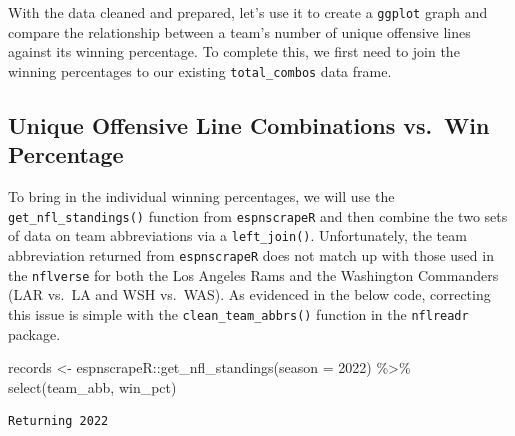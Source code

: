 \documentclass[
  letterpaper,
]{krantz}
\newenvironment{Shaded}{\begin{snugshade}}{\end{snugshade}}
\newcommand{\AttributeTok}[1]{\textcolor[rgb]{0.40,0.45,0.13}{#1}}
\newcommand{\DecValTok}[1]{\textcolor[rgb]{0.68,0.00,0.00}{#1}}
\newcommand{\FunctionTok}[1]{\textcolor[rgb]{0.28,0.35,0.67}{#1}}
\newcommand{\NormalTok}[1]{\textcolor[rgb]{0.00,0.23,0.31}{#1}}
\newcommand{\OtherTok}[1]{\textcolor[rgb]{0.00,0.23,0.31}{#1}}
\newcommand{\SpecialCharTok}[1]{\textcolor[rgb]{0.37,0.37,0.37}{#1}}
\newcommand{\StringTok}[1]{\textcolor[rgb]{0.13,0.47,0.30}{#1}}
\begin{document}
With the data cleaned and prepared, let's use it to create a
\texttt{ggplot} graph and compare the relationship between a team's
number of unique offensive lines against its winning percentage. To
complete this, we first need to join the winning percentages to our
existing \texttt{total\_combos} data frame.

\hypertarget{unique-offensive-line-combinations-vs.-win-percentage}{%
\subsection{Unique Offensive Line Combinations vs.~Win
Percentage}\label{unique-offensive-line-combinations-vs.-win-percentage}}

To bring in the individual winning percentages, we will use the
\texttt{get\_nfl\_standings()} function from \texttt{espnscrapeR} and
then combine the two sets of data on team abbreviations via a
\texttt{left\_join()}. Unfortunately, the team abbreviation returned
from \texttt{espnscrapeR} does not match up with those used in the
\texttt{nflverse} for both the Los Angeles Rams and the Washington
Commanders (LAR vs.~LA and WSH vs.~WAS). As evidenced in the below code,
correcting this issue is simple with the \texttt{clean\_team\_abbrs()}
function in the \texttt{nflreadr} package.

\begin{Shaded}
\begin{Highlighting}[]
\NormalTok{records }\OtherTok{\textless{}{-}}\NormalTok{ espnscrapeR}\SpecialCharTok{::}\FunctionTok{get\_nfl\_standings}\NormalTok{(}\AttributeTok{season =} \DecValTok{2022}\NormalTok{) }\SpecialCharTok{\%\textgreater{}\%}
  \FunctionTok{select}\NormalTok{(team\_abb, win\_pct)}
\end{Highlighting}
\end{Shaded}

\begin{verbatim}
Returning 2022
\end{verbatim}

\begin{Shaded}
\end{Shaded}
\end{document}
